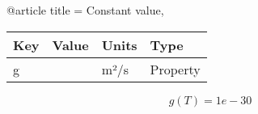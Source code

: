 @article{
title = {Constant value},
}

\begin{tabular}{|l|l|l|l|}
    \hline
    Key & Value & Units & Type \\
    \hline
    g &   & m²/s & Property\\
    \hline
\end{tabular}

\begin{equation}
g(T)=1e-30
\end{equation}


